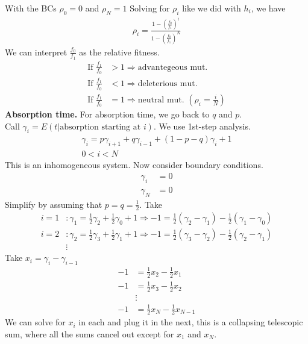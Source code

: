 \documentclass[12pt, letterpaper]{article}
\begin{document}
With the BCs $\rho_0 = 0$ and $\rho_N = 1$
Solving for $\rho_i$ like we did with $h_i$, we have 
\begin{align*}
    \rho_i = \frac{1-(\frac{f_0}{f_1})^i}{1-(\frac{f_0}{f_1})^N}
\end{align*}
We can interpret $\frac{f_0}{f_1}$ as the relative fitness.
\begin{align*}
    \text{If } \frac{f_1}{f_0} &> 1 \Rightarrow \text{advantegeous mut.} \\
    \text{If } \frac{f_1}{f_0} &< 1 \Rightarrow \text{deleterious mut.} \\
    \text{If } \frac{f_1}{f_0} &= 1 \Rightarrow \text{neutral mut. } (\rho_i = \frac{i}{N})
\end{align*}
\textbf{Absorption time.} For absorption time, we go back to $q$ and $p$. \\ 
Call $\gamma_i = E(t|\text{absorption starting at } i)$. We use 1st-step analysis.
\begin{align*}
    \gamma_i = p\gamma_{i+1} + q\gamma_{i-1} + (1-p-q)\gamma_i + 1 \\
    0 < i < N
\end{align*}
This is an inhomogeneous system. Now consider boundary conditions.
\begin{align*}
    \gamma_i &= 0 \\
    \gamma_N &= 0
\end{align*}
Simplify by assuming that $p=q =\frac 12$. Take 
\begin{align*}
    i = 1 &: \gamma_1 = \frac 12 \gamma_2 + \frac 12 \gamma_0 + 1 \Rightarrow -1 = \frac 12 (\gamma_2 -\gamma_1) -\frac 12 (\gamma_1-\gamma_0) \\
    i = 2 &: \gamma_2 = \frac 12 \gamma_3 + \frac 12 \gamma_1 + 1 \Rightarrow -1 = \frac 12 (\gamma_3 -\gamma_2) -\frac 12 (\gamma_2-\gamma_1) \\
    &\vdots
\end{align*}
Take $x_i = \gamma_i - \gamma_{i-1}$
\begin{align*}
    -1 &= \frac 12 x_2 - \frac 12 x_1 \\
    -1 &= \frac 12 x_3 - \frac 12 x_2 \\
    &\vdots \\
    -1 &= \frac 12 x_N - \frac 12 x_{N-1}
\end{align*}
We can solve for $x_i$ in each and plug it in the next, this is a collapsing telescopic sum,
where all the sums cancel out except for $x_1$ and $x_N$.
\end{document}
